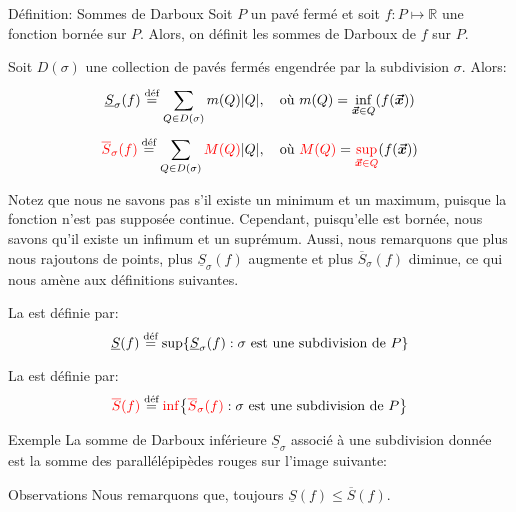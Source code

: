 \documentclass[a4paper]{article}
\begin{document}
\begin{parag}{Définition: Sommes de Darboux}
    Soit $P$ un pavé fermé et soit $f: P \mapsto \mathbb{R}$ une fonction bornée sur $P$. Alors, on définit les sommes de Darboux de $f$ sur $P$.

    Soit $D\left(\sigma\right)$ une collection de pavés fermés engendrée par la subdivision $\sigma$. Alors: 
    \[\underline{S}_{\sigma}\left(f\right) \over{=}{déf} \sum_{Q \in D\left(\sigma\right)}^{} m\left(Q\right) \left|Q\right|, \mathspace \text{où } m\left(Q\right) = \inf_{\bvec{x} \in Q}\left(f\left(\bvec{x}\right)\right)\]
    \[{\color{red}\overline{S}_{\sigma}\left(f\right)} \over{=}{déf} \sum_{Q \in D\left(\sigma\right)}^{} {\color{red}M\left(Q\right)} \left|Q\right|, \mathspace \text{où } {\color{red}M\left(Q\right)} = {\color{red}\sup_{\bvec{x} \in Q}}\left(f\left(\bvec{x}\right)\right)\]
    
    Notez que nous ne savons pas s'il existe un minimum et un maximum, puisque la fonction n'est pas supposée continue. Cependant, puisqu'elle est bornée, nous savons qu'il existe un infimum et un suprémum. Aussi, nous remarquons que plus nous rajoutons de points, plus $\underline{S}_{\sigma}\left(f\right)$ augmente et plus $\overline{S}_{\sigma}\left(f\right)$ diminue, ce qui nous amène aux définitions suivantes.

    La  est définie par: 
    \[\underline{S}\left(f\right) \over{=}{déf} \sup\left\{\underline{S}_{\sigma}\left(f\right) : \sigma \text{ est une subdivision de } P\right\}\]
    
    La  est définie par: 
    \[{\color{red}\overline{S}\left(f\right)} \over{=}{déf} {\color{red}\inf}\left\{{\color{red}\overline{S}_{\sigma}\left(f\right)} : \sigma \text{ est une subdivision de } P\right\}\]

    \begin{subparag}{Exemple}
        La somme de Darboux inférieure $\underline{S}_{\sigma}$ associé à une subdivision donnée est la somme des parallélépipèdes rouges sur l'image suivante:
    \end{subparag}
    

    \begin{subparag}{Observations}
        Nous remarquons que, toujours $\underline{S}\left(f\right) \leq \overline{S}\left(f\right)$.
    \end{subparag}
\end{parag}
\end{document}
